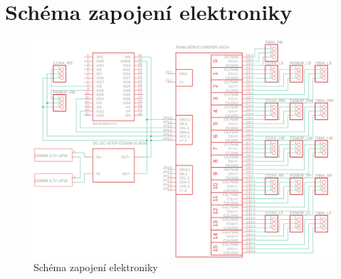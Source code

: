 \chapter{Schéma zapojení elektroniky}
\label{schematics}

\begin{figure}[hbt]
	\centering
	\includegraphics[width=1\textwidth, angle=90, origin=c]{obrazky-figures/schematics.png}
	\caption{Schéma zapojení elektroniky}
    \label{schem}
\end{figure}
